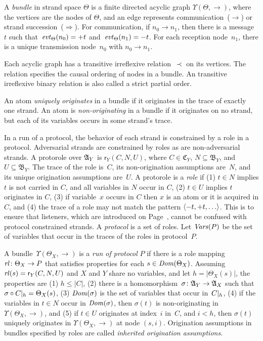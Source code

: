 \documentclass[12pt]{report}
\theoremstyle{definition}
\newcommand{\alga}{\alg{A}}
\newcommand{\tr}{\ensuremath{\mathfrak C}}
\newcommand{\base}{\ensuremath{\mathfrak B}}
\newcommand{\sdom}{\fn{Dom}}
\newcommand{\svars}{\fn{Vars}}
\newcommand{\evt}{\fn{evt}}
\newcommand{\role}{\mathsf{r}}
\newcommand{\rl}{\fn{rl}}
\begin{document}
A \emph{bundle} in strand space $\Theta$ is a finite
directed acyclic graph $\Upsilon(\Theta,\to)$, where the vertices are
the nodes of $\Theta$, and an edge represents
communication~($\rightarrow$) or strand succession~($\Rightarrow$).
For communication, if $n_0\rightarrow n_1$, then
there is a message~$t$ such that~$\evt_\Theta(n_0)=\outbnd t$
and~$\evt_\Theta(n_1)=\inbnd t$.  For each reception node~$n_1$, there
is a unique transmission node~$n_0$ with $n_0\rightarrow n_1$.

Each acyclic graph has a transitive irreflexive relation~$\prec$ on
its vertices.  The relation specifies the causal ordering of nodes in
a bundle.  An transitive irreflexive binary relation is also called a
strict partial
order.

An atom \emph{uniquely originates} in a
bundle if it originates in the trace of exactly one strand.  An atom
is \emph{non-originating} in a bundle if it
originates on no strand, but each of its variables occurs in some
strand's trace.

In a run of a protocol, the behavior of each strand is constrained by
a role in a protocol.  Adversarial strands are constrained by roles as
are non-adversarial strands.  A protorole over $\alga_Y$ is
$\role_Y(C,N,U)$, where $C\in\tr_Y$, $N\subseteq\base_Y$, and
$U\subseteq\base_Y$.  The trace of the role is~$C$, its
non-origination assumptions are~$N$, and its unique origination
assumptions are~$U$.  A protorole is a \emph{role} if (1)
$t\in N$ implies $t$ is not carried in $C$, and all variables in $N$
occur in $C$, (2) $t\in U$ implies $t$ originates in $C$, (3) if
variable~$x$ occurs in $C$ then $x$ is an atom or it is acquired in
$C$, and (4) the trace of a role may not match the pattern
$\langle\mathord - t, \mathord + t,\ldots\rangle$.  This is to ensure
that listeners, which are introduced on Page~\pageref{def:listeners},
cannot be confused with protocol constrained strands.
A \emph{protocol} is a set of roles.  Let
\index{Vars@\svars}$\svars(P)$ be the set of variables that occur in
the traces of the roles in protocol~$P$.

A bundle~$\Upsilon(\Theta_X,\to)$ is a \emph{run of protocol} $P$ if there is a role mapping
$\rl\colon\Theta_X\to P$ that satisfies properties for each
$s\in\sdom(\Theta_X)$.  Assuming $\rl(s)=\role_Y(C,N,U)$ and $X$ and
$Y$ share no variables, and let $h=|\Theta_X(s)|$, the properties are
(1) $h\leq|C|$, (2) there is a
homomorphism~$\sigma\colon\alga_Y\to\alga_X$ such that
${\mathord{\sigma}}\circ{\mathord{C|_{h}}}=\Theta_X(s)$, (3) $\sdom(\sigma)$ is the
set of variables that occur in~$C|_{h}$, (4) if the variables
in $t\in N$ occur in $\sdom(\sigma)$, then $\sigma(t)$ is
non-originating in $\Upsilon(\Theta_X,\to)$, and (5) if $t\in U$
originates at index~$i$ in~$C$, and $i<h$, then $\sigma(t)$
uniquely originates in $\Upsilon(\Theta_X,\to)$ at node $(s,i)$.
Origination assumptions in bundles specified by roles are called
\emph{inherited origination
  assumptions}.
\end{document}
